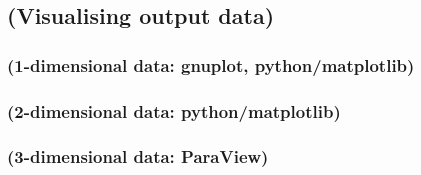 \documentclass[10pt,a4paper]{article}
\begin{document}
\subsection{(Visualising output data)}
\subsubsection{(1-dimensional data: gnuplot, python/matplotlib)}
\subsubsection{(2-dimensional data: python/matplotlib)}
\subsubsection{(3-dimensional data: ParaView)}
\end{document}
